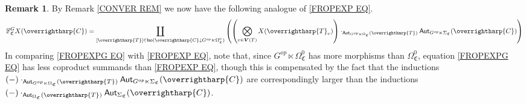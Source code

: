 \documentclass[a4paper,10pt
,draft
]{article}%
\numberwithin{equation}{section}
\numberwithin{figure}{section}
\theoremstyle{definition} %
\newtheorem{remark}[equation]{Remark}%
\newcommand{\vect}[1]{\text{\overrightharp{\ensuremath{#1}}}}
\newcommand{\1}{\ensuremath{\mathbbm 1}}%
\begin{document}
\begin{remark}\label{FROPEXPG REM}
By Remark \ref{CONVER REM} we now have the following analogue of
\eqref{FROPEXP EQ}.
\begin{equation}\label{FROPEXPG EQ}
\mathbb{F}^G_{\mathfrak{C}} X (\vect{C})
=
\coprod_{[\vect{T}] \in 
\mathsf{Iso}(\vect{C} \downarrow G^{op} \ltimes \Omega^0_{\mathfrak{C}})}
\left(
\left(
\bigotimes_{v \in \boldsymbol{V}(T)} X(\vect{T}_v)
\right)
\cdot_{\mathsf{Aut}_{G^{op} \ltimes \Omega_{\mathfrak{C}}}(\vect{T})}
\mathsf{Aut}_{G^{op} \ltimes \Sigma_{\mathfrak{C}}}(\vect{C})
\right)
\end{equation}
In comparing \eqref{FROPEXPG EQ} with \eqref{FROPEXP EQ},
note that,
since $G^{op} \ltimes \Omega^0_{\mathfrak{C}}$
has more morphisms than
$\Omega^0_{\mathfrak{C}}$,
equation \eqref{FROPEXPG EQ} has less coproduct summands than \eqref{FROPEXP EQ},
though this is compensated by the fact that the inductions
$(-)\cdot_{\mathsf{Aut}_{G^{op} \ltimes \Omega_{\mathfrak{C}}}(\vect{T})}
\mathsf{Aut}_{G^{op} \ltimes \Sigma_{\mathfrak{C}}}(\vect{C})$
are correspondingly larger than the inductions
$(-)\cdot_{\mathsf{Aut}_{\Omega_{\mathfrak{C}}}(\vect{T})}
\mathsf{Aut}_{\Sigma_{\mathfrak{C}}}(\vect{C})$.
\end{remark}
\end{document}
